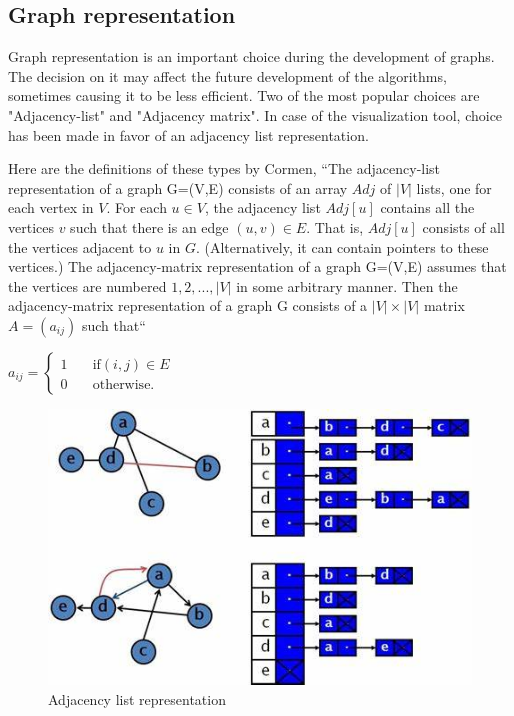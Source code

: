\subsection{Graph representation}

Graph representation is an important choice during the development of graphs. The decision on it may affect the future development of the algorithms, sometimes causing it to be less efficient. Two of the most popular choices are "Adjacency-list" and "Adjacency matrix". In case of the visualization tool, choice has been made in favor of an adjacency list representation.

Here are the definitions of these types by Cormen, ``The adjacency-list representation of a graph G=(V,E) consists of an array $Adj$ of $|V|$ lists, one for each vertex in $V$. For each $u \in V$, the adjacency list $Adj[u]$ contains all the vertices $v$ such that there is an edge $(u,v) \in E$. That is, $Adj[u]$ consists of all the vertices adjacent to $u$ in $G$. (Alternatively, it can contain pointers to these vertices.) The adjacency-matrix representation of a graph G=(V,E) assumes that the vertices are numbered $1,2,...,|V|$ in some arbitrary manner. Then the adjacency-matrix representation of a graph G consists of a $|V| \times |V|$ matrix $A = (a_{ij})$ such that``~\cite{cormen-introduction-to-algorithms}

\begin{math}
	a_{ij} = 
	\begin{cases}
		1		& \quad \text{if} (i,j) \in E\\
		0		& \quad \text{otherwise.}
	\end{cases}
\end{math}

\begin{figure}[H]
	\centering
	\includegraphics[width=120mm]{images/adjacency_list.jpg}
	\caption{Adjacency list representation}
\end{figure}

